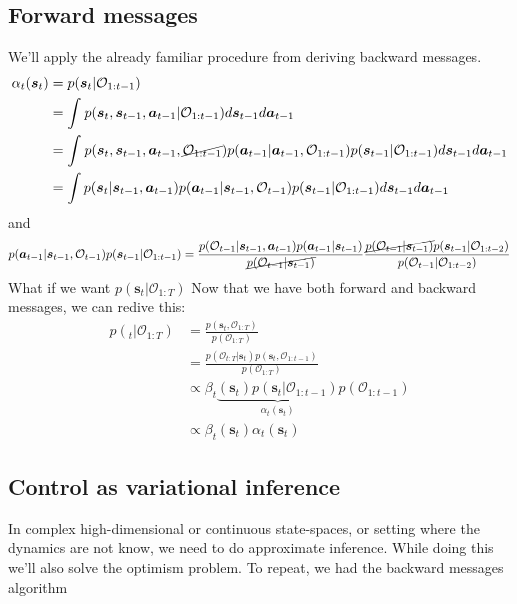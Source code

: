 \documentclass{report}
\begin{document}
\subsection{Forward messages}
We'll apply the already familiar procedure from deriving backward messages.
\begin{align}
\alpha_{ t } (\bm{s}_{t}) &= p (\bm{s}_{t}| \mathcal{O}_{ 1:t-1 }) \\
&= \int_{}^{} p (\bm{s}_{t}, \bm{s}_{t-1}, \bm{a}_{t-1}| \mathcal{O}_{ 1:t-1 }) d\bm{s}_{t-1} d\bm{a}_{t-1} \\
&= \int_{}^{} p (\bm{s}_{t}, \bm{s}_{t-1}, \bm{a}_{t-1}, \cancel{ \mathcal{O}_{ 1:t-1 }}) 
p(\bm{a}_{t-1}| \bm{a}_{t-1}, \mathcal{O}_{ 1:t-1 }) p (\bm{s}_{t-1}| \mathcal{O}_{ 1:t-1 })
d\bm{s}_{t-1} d\bm{a}_{t-1} \\
&= \int p (\bm{s}_{t}| \bm{s}_{t-1}, \bm{a}_{t-1}) p (\bm{a}_{t-1}| \bm{s}_{t-1}, \mathcal{O}_{ t-1 })
p (\bm{s}_{t-1}| \mathcal{O}_{ 1:t-1 })
d\bm{s}_{t-1} d\bm{a}_{t-1} \\
\end{align}
and
\begin{equation}
p (\bm{a}_{t-1}| \bm{s}_{t-1}, \mathcal{O}_{ t-1 })p (\bm{s}_{t-1}| \mathcal{O}_{ 1:t-1 }) =
\frac{p (\mathcal{O}_{ t-1 }|\bm{s}_{t-1}, \bm{a}_{t-1})p (\bm{a}_{t-1}| \bm{s}_{t-1} )}{\cancel{p (\mathcal{O}_{ t-1 }|\bm{s}_{t-1})}} 
\frac{\cancel{p (\mathcal{O}_{ t-1 }| \bm{s}_{t-1})} p (\bm{s}_{t-1}| \mathcal{O}_{ 1:t-2 })}{p (\mathcal{O}_{ t-1 }| \mathcal{O}_{ 1:t-2 })} 
\end{equation}
What if we want $ p (\bm{s}_{t}| \mathcal{O}_{ 1:T })  $
Now that we have both forward and backward messages, we can redive this:
\begin{align}
p (\bm{}_{t}| \mathcal{O}_{ 1:T }) &=
\frac{p (\bm{s}_{t}, \mathcal{O}_{ 1:T })}{p (\mathcal{O}_{ 1:T })} \\
&= \frac{p (\mathcal{O}_{ t:T }|\bm{s}_{t}) p (\bm{s}_{t}, \mathcal{O}_{ 1:t-1 })}{p (\mathcal{O}_{ 1:T })} \\
&\propto \beta_{ t } 
\underbrace{(\bm{s}_{t}) p (\bm{s}_{t}| \mathcal{O}_{ 1:t-1 }) }_{ \alpha_{ t } (\bm{s}_{t}) }
p (\mathcal{O}_{ 1:t-1 }) \\
&\propto \beta_{ t } (\bm{s}_{t}) \alpha_{ t } (\bm{s}_{t})
\end{align}

\subsection{Control as variational inference}
In complex high-dimensional or continuous state-spaces, or setting where the dynamics are
not know, we need to do approximate inference.
While doing this we'll also solve the optimism problem.
To repeat, we had the backward messages algorithm
\end{document}
